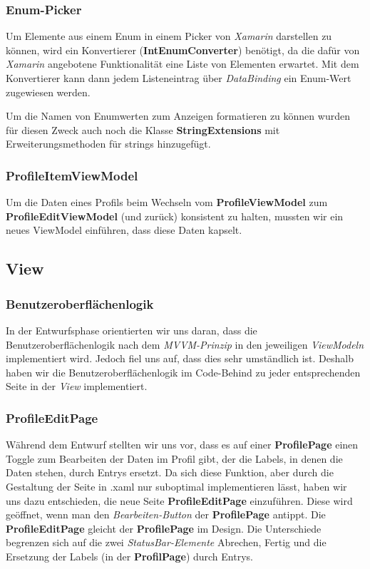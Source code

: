 \documentclass[a4paper]{scrreprt}
\begin{document}
\subsubsection{Enum-Picker}
Um Elemente aus einem Enum in einem Picker von \textit{Xamarin} darstellen zu können, wird ein Konvertierer (\textbf{IntEnumConverter}) benötigt, da die dafür von \textit{Xamarin} angebotene Funktionalität eine Liste von Elementen erwartet. Mit dem Konvertierer kann dann jedem Listeneintrag über \textit{DataBinding} ein Enum-Wert zugewiesen werden.

Um die Namen von Enumwerten zum Anzeigen formatieren zu können wurden für diesen Zweck auch noch die Klasse \textbf{StringExtensions} mit Erweiterungsmethoden für strings hinzugefügt.

\subsubsection{ProfileItemViewModel}
Um die Daten eines Profils beim Wechseln vom \textbf{ProfileViewModel} zum \textbf{ProfileEditViewModel} (und zurück) konsistent zu halten, mussten wir ein neues ViewModel einführen, dass diese Daten kapselt.

\subsection{View}
\subsubsection{Benutzeroberflächenlogik}
In der Entwurfsphase orientierten wir uns daran, dass die Benutzeroberflächenlogik nach dem \textit{MVVM-Prinzip} in den jeweiligen \textit{ViewModeln} implementiert wird. Jedoch fiel uns auf, dass dies sehr umständlich ist. Deshalb haben wir die Benutzeroberflächenlogik im Code-Behind zu jeder entsprechenden Seite in der \textit{View} implementiert.
\subsubsection{ProfileEditPage}
Während dem Entwurf stellten wir uns vor, dass es auf einer \textbf{ProfilePage} einen Toggle zum Bearbeiten der Daten im Profil gibt, der die Labels, in denen die Daten stehen, durch Entrys ersetzt. Da sich diese Funktion, aber durch die Gestaltung der Seite in .xaml nur suboptimal implementieren lässt, haben wir uns dazu entschieden, die neue Seite \textbf{ProfileEditPage} einzuführen. Diese wird geöffnet, wenn man den \textit{Bearbeiten-Button
} der \textbf{ProfilePage} antippt. Die \textbf{ProfileEditPage} gleicht der \textbf{ProfilePage} im Design. Die Unterschiede begrenzen sich auf die zwei \textit{StatusBar-Elemente} \dq{}Abrechen\dq{}, \dq{}Fertig\dq{} und die Ersetzung der Labels (in der \textbf{ProfilPage}) durch Entrys.
\end{document}
